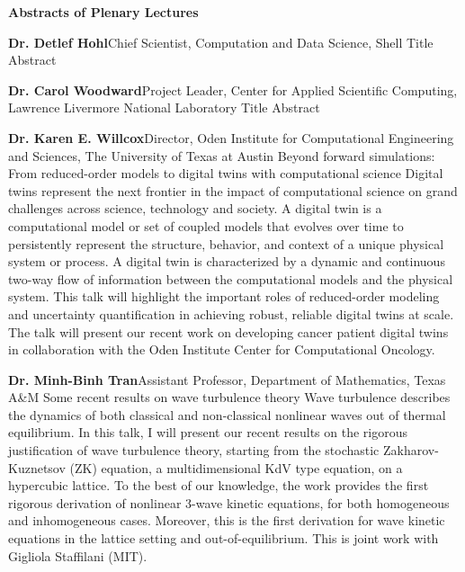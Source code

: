 \begin{center}
{\Large \bfseries Abstracts of Plenary Lectures}
\end{center}
\vspace{1ex}


\label{plenary1}
\abs
{{\bfseries Dr. Detlef Hohl}}{Chief Scientist, Computation and Data Science, Shell}
{Title}
{Abstract}
\bigskip


\label{plenary2}
\abs
{{\bfseries Dr. Carol Woodward}}{Project Leader, Center for Applied Scientific Computing, Lawrence Livermore National Laboratory}
{Title}
{Abstract}
\bigskip


\label{plenary3}
\abs
{{\bfseries Dr. Karen E. Willcox}}{Director, Oden Institute for Computational Engineering and Sciences, The University of Texas at Austin}
{Beyond forward simulations: From reduced-order models to digital twins with computational science}
{Digital twins represent the next frontier in the impact of computational science on grand challenges across science, technology and society. A digital twin is a computational model or set of coupled models that evolves over time to persistently represent the structure, behavior, and context of a unique physical system or process. A digital twin is characterized by a dynamic and continuous two-way flow of information between the computational models and the physical system. This talk will highlight the important roles of reduced-order modeling and uncertainty quantification in achieving robust, reliable digital twins at scale. The talk will present our recent work on developing cancer patient digital twins in collaboration with the Oden Institute Center for Computational Oncology.}
\bigskip


\label{plenary4}
\abs
{{\bfseries Dr. Minh-Binh Tran}}{Assistant Professor, Department of Mathematics, Texas A\&M}
{Some recent results on wave turbulence theory}
{Wave turbulence describes the dynamics of both classical and non-classical nonlinear waves out of thermal equilibrium. In this talk, I will present our recent results on the rigorous justification of wave turbulence theory, starting from the stochastic Zakharov-Kuznetsov (ZK) equation, a multidimensional KdV type equation, on a hypercubic lattice. To the best of our knowledge, the work provides the first rigorous derivation of nonlinear 3-wave kinetic equations, for both homogeneous and inhomogeneous cases. Moreover, this is the first derivation for wave kinetic equations in the lattice setting and out-of-equilibrium. This is joint work with Gigliola Staffilani (MIT).}

